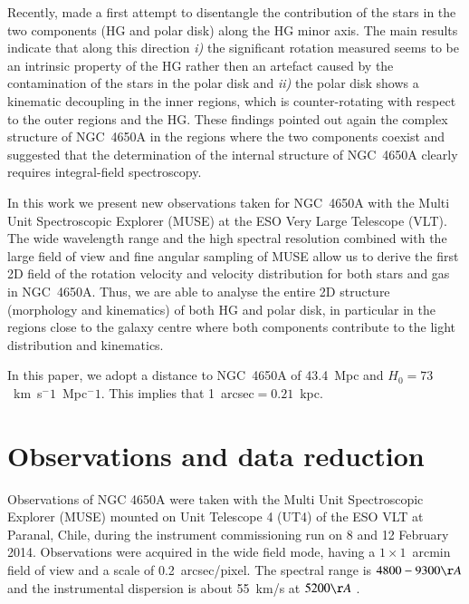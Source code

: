 \documentclass{aa}
\begin{document}
Recently, \citet{Coccato2014} made a first attempt to disentangle the
contribution of the stars in the two components (HG and polar disk)
along the HG minor axis.  The main results indicate that along this
direction {\it i)} the significant rotation measured seems to be an
intrinsic property of the HG rather then an artefact caused by the
contamination of the stars in the polar disk and {\it ii)} the polar disk
shows a kinematic decoupling in the inner regions, which is
counter-rotating with respect to the outer regions and the HG.  These
findings pointed out again the complex structure of NGC~4650A in the
regions where the two components coexist and suggested that the
determination of the internal structure of NGC~4650A clearly
requires integral-field spectroscopy.

In this work we present new observations taken for NGC~4650A with the
Multi Unit Spectroscopic Explorer (MUSE) at the ESO Very Large
Telescope (VLT).  The wide wavelength range and the high spectral
resolution combined with the large field of view and fine angular
sampling of MUSE \citep{Bacon2010} allow us to derive the first
2D field of the rotation velocity and velocity
distribution for both stars and gas in NGC~4650A. Thus, we are able to
analyse the entire 2D structure (morphology and
kinematics) of both HG and polar disk, in particular in the regions
close to the galaxy centre where both components contribute to
the light distribution and kinematics.

In this paper, we adopt a distance to NGC~4650A of 43.4~Mpc and
$H_0=73$~km~s$^-1$~Mpc$^-1$. This implies that 1~arcsec$= 0.21$~kpc.
   
   
   
                
\section{Observations and data reduction}\label{data}

Observations of NGC 4650A were taken with the Multi Unit Spectroscopic
Explorer (MUSE) mounted on  Unit Telescope 4 (UT4) of the ESO VLT
at Paranal, Chile, during the instrument commissioning run on 8 and 12
February 2014. Observations were acquired in the wide field mode,
having a $1 \times 1$~arcmin field of view and a scale of
0.2~arcsec/pixel. The spectral range is $4800 - 9300 \AA$ and the
instrumental dispersion is about 55~km/s at $5200 \AA$
\citep{Bacon2010}.
\end{document}
